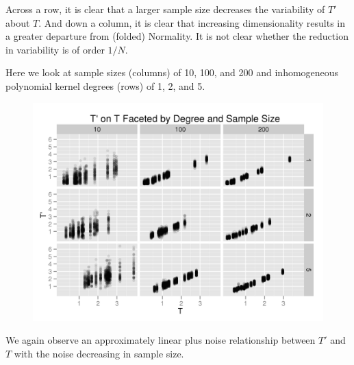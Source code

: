 Across a row, it is clear that a larger sample size decreases the
variability of $T'$ about $T$.  And down a column, it is clear that
increasing dimensionality results in a greater departure from (folded)
Normality.  It is not clear whether the reduction in variability is of
order $1/N$.
\clearpage

Here we look at sample sizes (columns) of 10, 100, and 200 and
inhomogeneous polynomial kernel degrees (rows) of 1, 2, and 5.
\begin{figure}[!ht]
  \centering
  \includegraphics{./simulations/ARC/poly_ker_ARC.png}
\end{figure}

We again observe an approximately linear plus noise relationship
between $T'$ and $T$ with the noise decreasing in sample size.  
